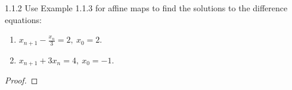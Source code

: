 \begin{problem}{1.1.2}
  Use Example 1.1.3 for affine maps to find the solutions to the difference equations:
  \begin{enumerate}
    \item $x_{n+1} - \frac{x_n}{3} = 2,\ x_0 = 2$.
    \item $x_{n+1} + 3x_n = 4,\ x_0 = -1$.
  \end{enumerate}
\end{problem}

\begin{proof}
\end{proof}
\newpage
